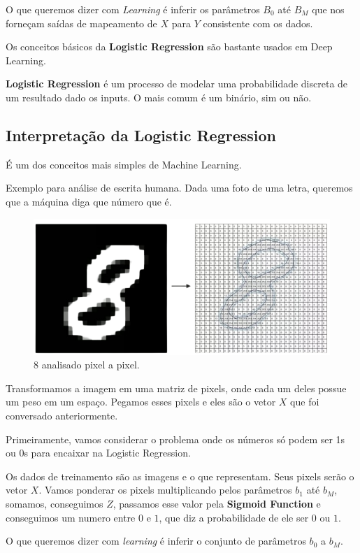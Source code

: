 \documentclass[11pt, a4paper]{article}
\begin{document}
O que queremos dizer com \textit{Learning} é inferir os parâmetros $B_0$ até $B_M$ que nos forneçam saídas de mapeamento de $X$ para $Y$ consistente com os dados.

Os conceitos básicos da \textbf{Logistic Regression} são bastante usados em Deep Learning.

\textbf{Logistic Regression} é um processo de modelar uma probabilidade discreta de um resultado dado os inputs. O mais comum é um binário, sim ou não.


\subsection{Interpretação da Logistic Regression}

É um dos conceitos mais simples de Machine Learning.

Exemplo para análise de escrita humana.
Dada uma foto de uma letra, queremos que a máquina diga que número que é.
\begin{figure}[h]
\centering
\includegraphics[scale=0.3]{8-traduzido}
\caption{8 analisado pixel a pixel.}
\end{figure}

Transformamos a imagem em uma matriz de pixels, onde cada um deles possue um peso em um espaço. Pegamos esses pixels e eles são o vetor $X$ que foi conversado anteriormente.

Primeiramente, vamos considerar o problema onde os números só podem ser 1s ou 0s para encaixar na Logistic Regression.

Os dados de treinamento são as imagens e o que representam. Seus pixels serão o vetor $X$.
Vamos ponderar os pixels multiplicando pelos parâmetros $b_1$ até $b_M$, somamos, conseguimos $Z$, passamos esse valor pela \textbf{Sigmoid Function} e conseguimos um numero entre $0$ e $1$, que diz a probabilidade de ele ser $0$ ou $1$.

\begin{center}
O que queremos dizer com \textit{learning} é inferir o conjunto de parâmetros $b_0$ a $b_M$.
\end{center}
\end{document}

